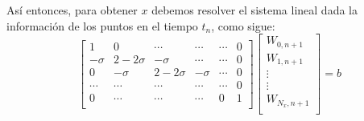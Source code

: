 \documentclass[letterpaper]{article}
\newcommand{\5}
{
\\[.5cm]
}
\begin{document}
\begin{itemize}
Así entonces, para obtener $x$ debemos resolver el sistema lineal dada la información de los puntos en el tiempo $t_n$, como sigue:
\begin{equation}
	\begin{bmatrix}
    1       & 0 & \cdots & \cdots & \cdots & 0 \\
    -\sigma       & 2-2\sigma & -\sigma & \cdots & \cdots & 0 \\
    0 & -\sigma       & 2-2\sigma & -\sigma & \cdots & 0 \\
    \cdots & \cdots & \cdots & \cdots  & \cdots & 0\\
    0 & \cdots & \cdots & \cdots  & 0 & 1 \\
	\end{bmatrix}
	\begin{bmatrix}
    W_{0, n+1} \\
    W_{1, n+1} \\
    \vdots \\
    \vdots \\
    W_{N_{x}, n+1} \\
    \end{bmatrix}
= b
\end{equation}


\end{itemize}
\end{document}
